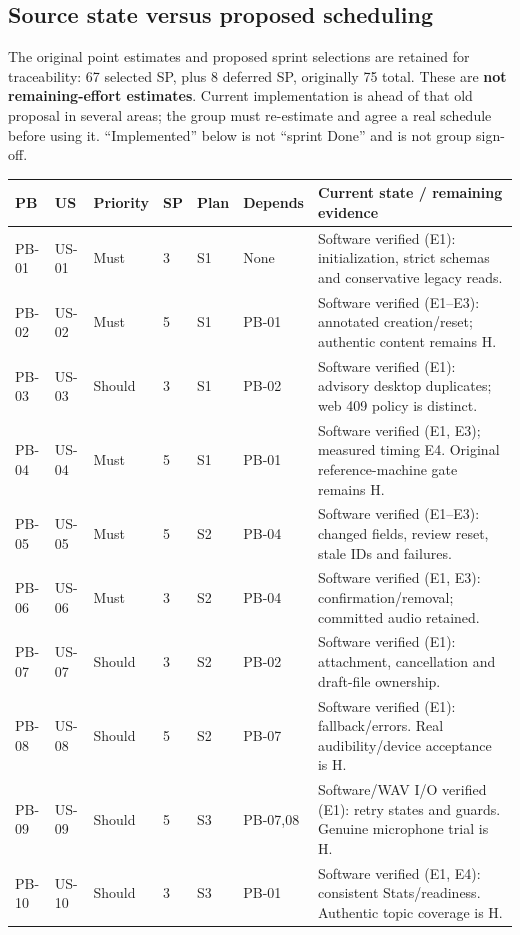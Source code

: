 \documentclass[11pt,a4paper]{article}
\begin{document}
\subsection{Source state versus proposed scheduling}
The original point estimates and proposed sprint selections are retained for
traceability: 67 selected SP, plus 8 deferred SP, originally 75 total.
These are \textbf{not remaining-effort estimates}. Current implementation is
ahead of that old proposal in several areas; the group must re-estimate and
agree a real schedule before using it. ``Implemented'' below is not ``sprint
Done'' and is not group sign-off.
\begingroup\small\setlength{\tabcolsep}{3pt}
\begin{longtable}{L{1.2cm}L{1.2cm}L{1.5cm}L{0.6cm}L{1.1cm}L{2cm}L{6.7cm}}
\toprule\textbf{PB} & \textbf{US} & \textbf{Priority} & \textbf{SP} & \textbf{Plan} & \textbf{Depends} & \textbf{Current state / remaining evidence}\\\midrule\endhead
PB-01 & US-01 & Must & 3 & S1 & None & Software verified (E1): initialization, strict schemas and conservative legacy reads.\\
PB-02 & US-02 & Must & 5 & S1 & PB-01 & Software verified (E1--E3): annotated creation/reset; authentic content remains H.\\
PB-03 & US-03 & Should & 3 & S1 & PB-02 & Software verified (E1): advisory desktop duplicates; web 409 policy is distinct.\\
PB-04 & US-04 & Must & 5 & S1 & PB-01 & Software verified (E1, E3); measured timing E4. Original reference-machine gate remains H.\\
PB-05 & US-05 & Must & 5 & S2 & PB-04 & Software verified (E1--E3): changed fields, review reset, stale IDs and failures.\\
PB-06 & US-06 & Must & 3 & S2 & PB-04 & Software verified (E1, E3): confirmation/removal; committed audio retained.\\
PB-07 & US-07 & Should & 3 & S2 & PB-02 & Software verified (E1): attachment, cancellation and draft-file ownership.\\
PB-08 & US-08 & Should & 5 & S2 & PB-07 & Software verified (E1): fallback/errors. Real audibility/device acceptance is H.\\
PB-09 & US-09 & Should & 5 & S3 & PB-07,08 & Software/WAV I/O verified (E1): retry states and guards. Genuine microphone trial is H.\\
PB-10 & US-10 & Should & 3 & S3 & PB-01 & Software verified (E1, E4): consistent Stats/readiness. Authentic topic coverage is H.\\

\end{longtable}
\end{document}
